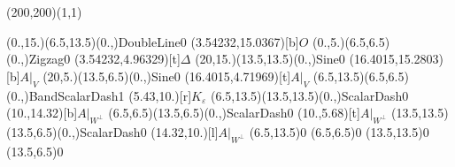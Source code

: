 \unitlength=1bp%

\begin{feynartspicture}(200,200)(1,1)

\FADiagram{}
\FAProp(0.,15.)(6.5,13.5)(0.,){DoubleLine}{0}
\FALabel(3.54232,15.0367)[b]{$O$}
\FAProp(0.,5.)(6.5,6.5)(0.,){Zigzag}{0}
\FALabel(3.54232,4.96329)[t]{$\Delta$}
\FAProp(20,15.)(13.5,13.5)(0.,){Sine}{0}
\FALabel(16.4015,15.2803)[b]{$A|_V$}
\FAProp(20,5.)(13.5,6.5)(0.,){Sine}{0}
\FALabel(16.4015,4.71969)[t]{$A|_V$}
\FAProp(6.5,13.5)(6.5,6.5)(0.,){BandScalarDash}{1}
\FALabel(5.43,10.)[r]{$K_\varepsilon$}
\FAProp(6.5,13.5)(13.5,13.5)(0.,){ScalarDash}{0}
\FALabel(10.,14.32)[b]{$A|_{W^\perp}$}
\FAProp(6.5,6.5)(13.5,6.5)(0.,){ScalarDash}{0}
\FALabel(10.,5.68)[t]{$A|_{W^\perp}$}
\FAProp(13.5,13.5)(13.5,6.5)(0.,){ScalarDash}{0}
\FALabel(14.32,10.)[l]{$A|_{W^\perp}$}
\FAVert(6.5,13.5){0}
\FAVert(6.5,6.5){0}
\FAVert(13.5,13.5){0}
\FAVert(13.5,6.5){0}
\end{feynartspicture}

